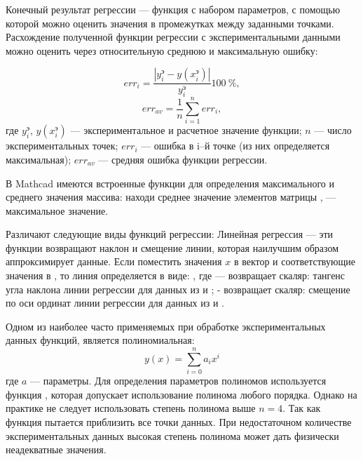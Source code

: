 Конечный результат регрессии --- функция с набором параметров, с помощью которой можно оценить значения в промежутках между заданными точками. Расхождение полученной функции регрессии с экспериментальными данными можно оценить через относительную среднюю и максимальную ошибку:

\begin{equation}
	err_i= \dfrac{\left| y_i^э - y(x^э_i) \right|}{y_i^э} 100\ \% ,
\end{equation}
\begin{equation}
	err_{av}=\dfrac{1}{n}\sum\limits_{i=1}^{n} err_i ,
\end{equation}
где $y_i^э$, $y(x_i^э)$ --- экспериментальное и расчетное значение функции; $n$ --- число экспериментальных точек; $err_i$ --- ошибка в i–й точке (из них определяется максимальная); $err_{av}$ --- средняя ошибка функции регрессии.

В Mathcad имеются встроенные функции для определения максимального и среднего значения массива: находи среднее значение элементов матрицы ,  --- максимальное значение.

Различают следующие виды функций регрессии:
Линейная регрессия  --- эти функции возвращают наклон и смещение линии, которая наилучшим образом аппроксимирует данные.
Если поместить значения $x$ в вектор  и соответствующие значения  в , то линия определяется в виде:
,
где  --- возвращает скаляр: тангенс угла наклона линии регрессии для данных из  и ;
 - возвращает скаляр: смещение по оси ординат линии регрессии для данных из  и .


\resh


Одном из  наиболее часто применяемых при обработке экспериментальных данных функций, является полиномиальная:
\begin{equation}
	y(x)= \sum_{i=0}^{n} a_i x^i
\end{equation}
где $a$ --- параметры. Для определения параметров полиномов используется функция , которая допускает использование полинома любого порядка. Однако на практике не следует использовать степень полинома выше $n = 4$. Так как функция  пытается приблизить все точки данных. При недостаточном количестве экспериментальных данных высокая степень полинома может дать физически неадекватные значения.

